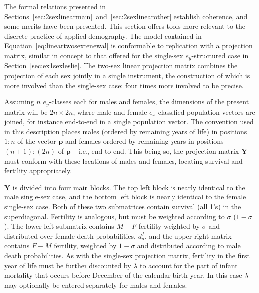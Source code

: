  \FloatBarrier
 \label{sec:ex2sxprojmat}
The formal relations presented in
Sections~\ref{sec:2sexlinearmain}~and~\ref{sec:2sexlinearother} establish
coherence, and some merits have been presented. This section offers tools
more relevant to the discrete practice of applied demography. The model
contained in Equation~\eqref{eq:lineartwosexrenewal} is conformable to
replication with a projection matrix, similar in concept to that offered for the 
single-sex $e_y$-structured
case in Section~\ref{sec:ex1sexleslie}. The two-sex linear projection matrix combines
the projection of each sex jointly in a single instrument, the construction of 
which is more involved than the single-sex case: four times more involved to be precise. 

Assuming $n$ $e_y$-classes each for males and females, the dimensions of the
present matrix will be $2n \times 2n$, where male and female
$e_x$-classified population vectors are joined, for instance end-to-end in a
single population vector. The convention used in this description places
males (ordered by remaining years of life) in positions $1:n$ of the vector
$\textbf{p}$ and females ordered by remaining years in positions $(n+1):(2n)$ of
$\textbf{p}$ -- i.e., end-to-end. This being so, the projection matrix
$\textbf{Y}$ must conform with these locations of males and females, locating survival and 
fertility appropriately.

$\textbf{Y}$ is divided into four main blocks. The top left block is
nearly identical to the male single-sex case, and the bottom left block is
nearly identical to the female single-sex case. Both of these two submatrices
contain survival (all 1's) in the superdiagonal. Fertility is analogous, but
must be weighted according to $\sigma$ ($1-\sigma$). The lower left submatrix
contains $M-F$ fertility weighted by $\sigma$ and distributed over female death probabilities,
$d_a^f$, and the upper right matrix contains $F-M$ fertility, weighted by
$1-\sigma$ and distributed according to male death probabilities. As with the
single-sex projection matrix, fertility in the first year of
life must be further discounted by $\lambda$ to account for the part of infant
mortality that occurs before December  of the calendar birth year. In
this case $\lambda$ may optionally be entered separately for males and females.

